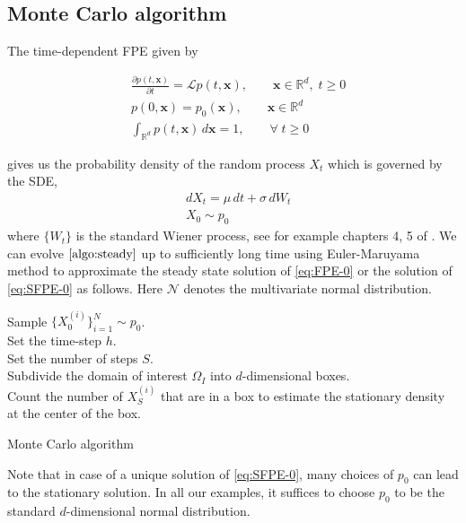 \subsection{Monte Carlo algorithm}\label{ssec-MC-algo}
The time-dependent FPE given by 


\begin{equation}
\begin{aligned}
    &\frac{\partial  p(t, \mathbf x)}{\partial t} =\mathcal L p(t, \mathbf x),\qquad\mathbf x\in\mathbb R^d,\; t\ge0\\&p(0, \mathbf x)=p_0(\mathbf x),\qquad\mathbf x\in\mathbb R^d\\
    &\int_{\mathbb R^d}p(t,\mathbf x)\,d\mathbf x = 1,\qquad\forall\;t\ge0
    \label{eq:FPE-0}
\end{aligned}
\end{equation}


gives us the probability density of the random process $X_t$ which is governed by the SDE,
\begin{equation}
\begin{aligned}
    &dX_t=\mu\,dt+\sigma\,dW_t\\
    &X_0\sim p_0\label{eq:SDE-0}
\end{aligned}
\end{equation}where $\{W_t\}$ is the standard Wiener process, see for example chapters 4, 5 of \cite{gardiner2009stochastic}. We can evolve $\eqref{algo:steady}$ up to sufficiently long time using Euler-Maruyama method \cite{kloeden1992stochastic} to approximate the steady state solution of \eqref{eq:FPE-0} or the solution of \eqref{eq:SFPE-0} as follows. Here $\mathcal N$ denotes the multivariate normal distribution.
\begin{algorithm}[!ht]
Sample $\{ X_0^{(i)}\}_{i=1}^N\sim p_0$.\\
Set the time-step $h$.\\
Set the number of steps $S$.\\
Subdivide the domain of interest $\Omega_I$ into $d$-dimensional boxes.\\ Count the number of $X^{(i)}_{S}$ that are in a box to estimate the stationary density at the center of the box.
\caption{Monte Carlo algorithm}\label{algo:MC}
\end{algorithm}
Note that in case of a unique solution of \eqref{eq:SFPE-0}, many choices of $p_0$ can lead to the stationary solution. In all our examples, it suffices to choose $p_0$ to be the standard $d$-dimensional normal distribution.

